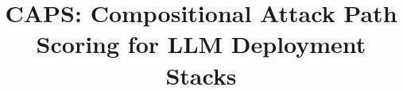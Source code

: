 \documentclass{BVP_JDSIS}
\begin{document}

\title{CAPS: Compositional Attack Path Scoring for LLM Deployment Stacks}





\maketitle









\end{document}
